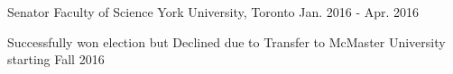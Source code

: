 \begin{cventries}

  \cventry
    {Senator} %
    {Faculty of Science} %
    {York University, Toronto} %
    {Jan. 2016 - Apr. 2016} %
    {
      \begin{cvitems} %
        \item Successfully won election but Declined due to Transfer to McMaster University starting Fall 2016
      \end{cvitems}
    }


\end{cventries}
